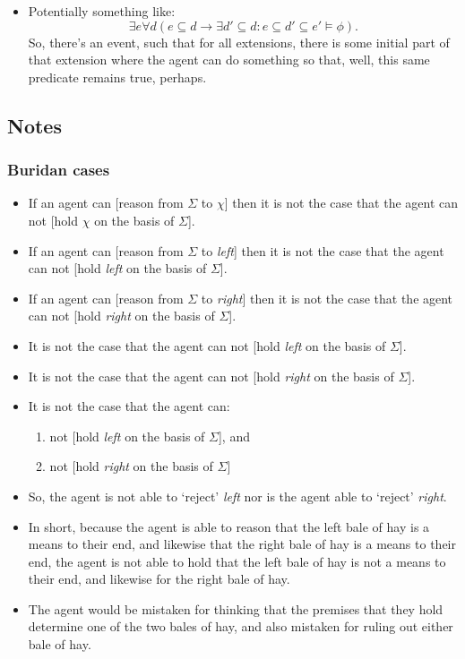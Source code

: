 \documentclass[10pt]{article}
\begin{document}
\begin{itemize}
\item Potentially something like:
  \[
    \exists e \forall d(e \subseteq d \rightarrow \exists d' \subseteq d \colon e \subseteq d' \subseteq e' \vDash \phi).
  \]
  So, there's an event, such that for all extensions, there is some initial part of that extension where the agent can do something so that, well, this same predicate remains true, perhaps.
\end{itemize}

\newpage


\subsection{Notes}
\label{sec:notes-1}

\subsubsection{Buridan cases}
\label{sec:buridan-cases}

\begin{itemize}
\item If an agent can [reason from \(\Sigma\) to \(\chi\)] then it is not the case that the agent can not [hold \(\chi\) on the basis of \(\Sigma\)].
\end{itemize}

\begin{itemize}
\item If an agent can [reason from \(\Sigma\) to \emph{left}] then it is not the case that the agent can not [hold \emph{left} on the basis of \(\Sigma\)].
\item If an agent can [reason from \(\Sigma\) to \emph{right}] then it is not the case that the agent can not [hold \emph{right} on the basis of \(\Sigma\)].
\item It is not the case that the agent can not [hold \emph{left} on the basis of \(\Sigma\)].
\item It is not the case that the agent can not [hold \emph{right} on the basis of \(\Sigma\)].
\item It is not the case that the agent can:
  \begin{enumerate}
  \item not [hold \emph{left} on the basis of \(\Sigma\)], and
  \item not [hold \emph{right} on the basis of \(\Sigma\)]
  \end{enumerate}
\item So, the agent is not able to `reject' \emph{left} nor is the agent able to `reject' \emph{right}.
\item In short, because the agent is able to reason that the left bale of hay is a means to their end, and likewise that the right bale of hay is a means to their end, the agent is not able to hold that the left bale of hay is not a means to their end, and likewise for the right bale of hay.
\item The agent would be mistaken for thinking that the premises that they hold determine one of the two bales of hay, and also mistaken for ruling out either bale of hay.
\end{itemize}
\end{document}
